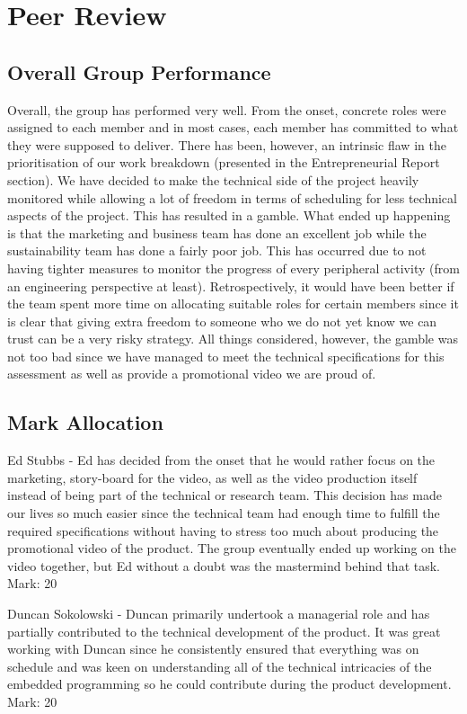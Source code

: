 \documentclass[12pt]{article}
\begin{document}
\section{Peer Review}
\subsection{Overall Group Performance}
Overall, the group has performed very well. From the onset, concrete roles were assigned to each member and in most cases, each member has committed to what they were supposed to deliver. There has been, however, an intrinsic flaw in the prioritisation of our work breakdown (presented in the Entrepreneurial Report section). We have decided to make the technical side of the project heavily monitored while allowing a lot of freedom in terms of scheduling for less technical aspects of the project. This has resulted in a gamble. What ended up happening is that the marketing and business team has done an excellent job while the sustainability team has done a fairly poor job. This has occurred due to not having tighter measures to monitor the progress of every peripheral activity (from an engineering perspective at least). Retrospectively, it would have been better if the team spent more time on allocating suitable roles for certain members since it is clear that giving extra freedom to someone who we do not yet know we can trust can be a very risky strategy. All things considered, however, the gamble was not too bad since we have managed to meet the technical specifications for this assessment as well as provide a promotional video we are proud of.  

\subsection{Mark Allocation}
Ed Stubbs - Ed has decided from the onset that he would rather focus on the marketing, story-board for the video, as well as the video production itself instead of being part of the technical or research team. This decision has made our lives so much easier since the technical team had enough time to fulfill the required specifications without having to stress too much about producing the promotional video of the product. The group eventually ended up working on the video together, but Ed without a doubt was the mastermind behind that task. Mark: 20

Duncan Sokolowski - Duncan primarily undertook a managerial role and has partially contributed to the technical development of the product. It was great working with Duncan since he consistently ensured that everything was on schedule and was keen on understanding all of the technical intricacies of the embedded programming so he could contribute during the product development. Mark: 20 
\end{document}
